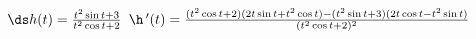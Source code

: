 {$\ds h(t) = \frac{t^2\sin t+3}{t^2\cos t+2}$
}
{$\h\,'(t) = \frac{(t^2\cos t+2)(2t\sin t+t^2\cos t)-(t^2\sin t+3)(2t\cos t-t^2\sin t)}{(t^2\cos t+2)^2}$
}
